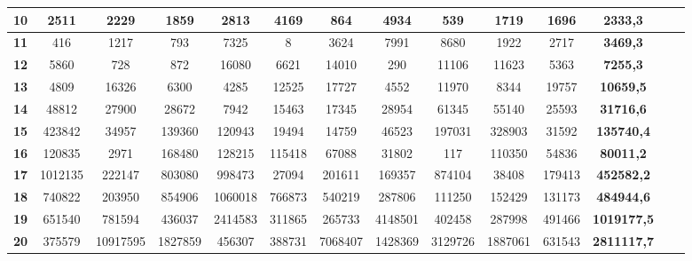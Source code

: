 \documentclass[10pt,a4paper,spanish]{report}
\begin{document}
\begin{table}[h!]
\begin{adjustbox}{max width=\textwidth}
\begin{tabular}{*{14}{|c}|}
   \textbf{10}                    & 2511       & 2229       & 1859       & 2813       & 4169       & 864        & 4934       & 539        & 1719       & 1696        & \textbf{2333,3}     \\ \hline
   \textbf{11}                    & 416        & 1217       & 793        & 7325       & 8          & 3624       & 7991       & 8680       & 1922       & 2717        & \textbf{3469,3}     \\ \hline
   \textbf{12}                    & 5860       & 728        & 872        & 16080      & 6621       & 14010      & 290        & 11106      & 11623      & 5363        & \textbf{7255,3}     \\ \hline
   \textbf{13}                    & 4809       & 16326      & 6300       & 4285       & 12525      & 17727      & 4552       & 11970      & 8344       & 19757       & \textbf{10659,5}    \\ \hline
   \textbf{14}                    & 48812      & 27900      & 28672      & 7942       & 15463      & 17345      & 28954      & 61345      & 55140      & 25593       & \textbf{31716,6}    \\ \hline
   \textbf{15}                    & 423842     & 34957      & 139360     & 120943     & 19494      & 14759      & 46523      & 197031     & 328903     & 31592       & \textbf{135740,4}   \\ \hline
   \textbf{16}                    & 120835     & 2971       & 168480     & 128215     & 115418     & 67088      & 31802      & 117        & 110350     & 54836       & \textbf{80011,2}    \\ \hline
   \textbf{17}                    & 1012135    & 222147     & 803080     & 998473     & 27094      & 201611     & 169357     & 874104     & 38408      & 179413      & \textbf{452582,2}   \\ \hline
   \textbf{18}                    & 740822     & 203950     & 854906     & 1060018    & 766873     & 540219     & 287806     & 111250     & 152429     & 131173      & \textbf{484944,6}   \\ \hline
   \textbf{19}                    & 651540     & 781594     & 436037     & 2414583    & 311865     & 265733     & 4148501    & 402458     & 287998     & 491466      & \textbf{1019177,5}  \\ \hline
   \textbf{20}                    & 375579     & 10917595   & 1827859    & 456307     & 388731     & 7068407    & 1428369    & 3129726    & 1887061    & 631543      & \textbf{2811117,7}  \\ \hline

\end{tabular}
\end{adjustbox}
\end{table}
\end{document}

